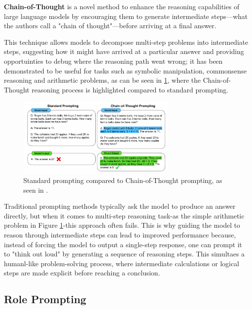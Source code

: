 \textbf{Chain-of-Thought} is a novel method to enhance the reasoning capabilities of large language models by encouraging them to generate intermediate steps—what the authors call a "chain of thought"—before arriving at a final answer. \cite{wei2023chainofthought}

This technique allows models to decompose multi-step problems into intermediate steps, suggesting how it might have arrived at a particular answer and providing opportuinties to debug where the reasoning path went wrong; it has been demonstrated to be useful for tasks such as symbolic manipulation, commonsense reasoning and arithmetic problems, as can be seen in \ref{fig:cot-prompting}, where the Chain-of-Thought reasoning process is highlighted compared to standard prompting.

\begin{figure}[h]
    \centering
    \includegraphics[width=0.7\textwidth]{images/cot-prompting.png}
    \caption{Standard prompting compared to Chain-of-Thought prompting, as seen in \cite{wei2023chainofthought}.}
    \label{fig:cot-prompting}
\end{figure}

Traditional prompting methods typically ask the model to produce an answer directly, but when it comes to multi-step reasoning task-as the simple arithmetic problem in Figure \ref{fig:cot-prompting}-this approach often fails. This is why guiding the model to reason through intermediate steps can lead to improved performance because, instead of forcing the model to output a single-step response, one can prompt it to "think out loud" by generating a sequence of reasoning steps. This simultaes a humanl-like problem-solving process, where intermediate calculations or logical steps are made explicit before reaching a conclusion.


\subsection{Role Prompting}
\label{sec:role-prompting}

